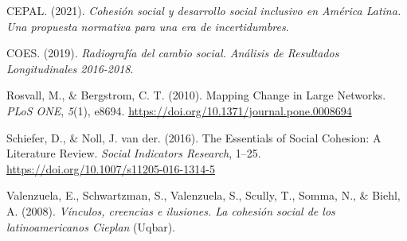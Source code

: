 \documentclass[
  12pt,
]{book}
\newlength{\cslhangindent}
\newlength{\cslentryspacingunit} %
\newenvironment{CSLReferences}[2] %
 {%
  \setlength{\parindent}{0pt}
  \ifodd #1
  \let\oldpar\par
  \def\par{\hangindent=\cslhangindent\oldpar}
  \fi
  \setlength{\parskip}{#2\cslentryspacingunit}
 }%
 {}
\begin{document}
\hypertarget{refs}{}
\begin{CSLReferences}{1}{0}
\leavevmode{}%
CEPAL. (2021). \emph{Cohesión social y desarrollo social inclusivo en {América Latina}. {Una} propuesta normativa para una era de incertidumbres}.

\leavevmode{}%
COES. (2019). \emph{Radiografía del cambio social. {Análisis} de {Resultados Longitudinales} 2016-2018}.

\leavevmode{}%
Rosvall, M., \& Bergstrom, C. T. (2010). Mapping {Change} in {Large Networks}. \emph{PLoS ONE}, \emph{5}(1), e8694. \url{https://doi.org/10.1371/journal.pone.0008694}

\leavevmode{}%
Schiefer, D., \& Noll, J. van der. (2016). The {Essentials} of {Social Cohesion}: {A Literature Review}. \emph{Social Indicators Research}, 1--25. \url{https://doi.org/10.1007/s11205-016-1314-5}

\leavevmode{}%
Valenzuela, E., Schwartzman, S., Valenzuela, S., Scully, T., Somma, N., \& Biehl, A. (2008). \emph{{Vínculos, creencias e ilusiones. La cohesión social de los latinoamericanos \textendash{} Cieplan}} (Uqbar).

\end{CSLReferences}
\end{document}
